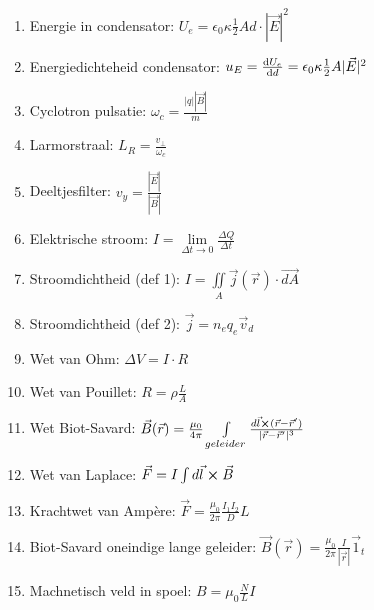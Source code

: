 \documentclass[12pt]{article}
\begin{document}
\begin{enumerate}
	    \item Energie in condensator: $ U_e = \epsilon_0 \kappa \frac{1}{2} A d \cdot |\vec{E}|^2 $
	    \item Energiedichteheid condensator: $ u_E = \dv{U_e}{d} = \epsilon_0 \kappa \frac{1}{2} A |\vec{E}|^2 $
	    \item Cyclotron pulsatie: $ \omega_c = \frac{|q||\vec{B}|}{m} $
	    \item Larmorstraal: $ L_R = \frac{v_{\perp}}{\omega_c} $
	    \item Deeltjesfilter:  $v_y = \frac{|\vec{E}|}{|\vec{B}|} $
	    \item Elektrische stroom: $ I = \lim\limits_{\Delta t \to 0} \frac{ \Delta Q}{\Delta t} $
	    \item Stroomdichtheid (def 1):  $ I = \iint\limits_A \vec{j}(\vec{r})\cdot \vec{dA} $
	    \item Stroomdichtheid (def 2): $ \vec{j} = n_e q_e \vec{v}_d $
	    \item Wet van Ohm: $\Delta V = I \cdot R $
	    \item Wet van Pouillet:  $ R = \rho \frac{L}{A} $
	    \item Wet Biot-Savard: $ \vec{B}(\vec{r}) = \frac{\mu_0}{4\pi} \int\limits_{geleider} \frac{d\vec{l}\cross (\vec{r}-\vec{r}')}{|\vec{r}-\vec{r}'|^3}$
	    \item Wet van Laplace: $ \vec{F} = I \int d\vec{l}\cross \vec{B} $
	    \item Krachtwet van Amp\`ere: $ \vec{F} = \frac{\mu_0}{2\pi}\frac{I_1 I_2}{D}L $
	    \item Biot-Savard oneindige lange geleider: $ \vec{B}(\vec{r}) = \frac{\mu_0}{2\pi}\frac{I}{|\vec{r}|}\vec{1}_t$
	    \item Machnetisch veld in spoel: $ B = \mu_0 \frac{N}{L} I $
    \end{enumerate}
\end{document}

